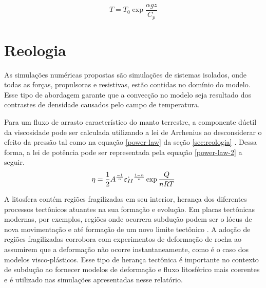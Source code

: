\begin{equation}{}\label{eq:adiabatic-temp}
  T = T_0 \exp{\frac{\alpha g z}{C_p}}
\end{equation}


\section{Reologia}

As simulações numéricas propostas são simulações de sistemas isolados, onde todas as forças, propulsoras e resistivas, estão contidas no domínio do modelo. Esse tipo de abordagem garante que a convecção no modelo seja resultado dos contrastes de densidade causados pelo campo de temperatura.

Para um fluxo de arrasto característico do manto terrestre, a componente dúctil da viscosidade pode ser calculada utilizando a lei de Arrhenius ao desconsiderar o efeito da pressão tal como na equação \ref{power-law} da seção \ref{sec:reologia} \citep{vankeken2008community}. Dessa forma, a lei de potência pode ser representada pela equação \ref{power-law-2} a seguir.
\begin{equation}{\label{power-law-2}}
	\eta = \frac{1}{2} A^{\frac{-1}{n}} \dot{\varepsilon_{II}}^{\frac{1-n}{n}} \exp{\frac{Q}{nRT}} 
\end{equation}


A litosfera contém regiões fragilizadas em seu interior, herança dos diferentes processos tectônicos atuantes na sua formação e evolução. Em placas tectônicas modernas, por exemplos, regiões onde ocorrera subdução podem ser o lócus de nova movimentação e até formação de um novo limite tectônico \citep{bercovici2014plate}. A adoção de regiões fragilizadas corrobora com experimentos de deformação de rocha ao assumirem que a deformação não ocorre instantaneamente, como é o caso dos modelos visco-plásticos. Esse tipo de herança tectônica é importante no contexto de subdução ao fornecer modelos de deformação e fluxo litosférico mais coerentes e é utilizado nas simulações apresentadas nesse relatório.

